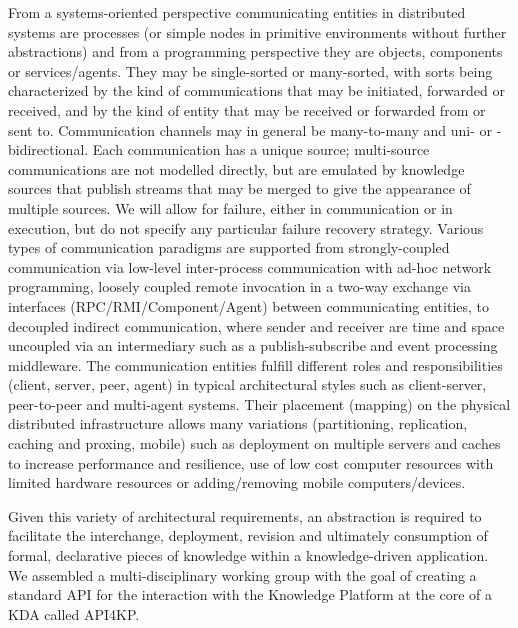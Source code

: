 \documentclass[runningheads]{llncs}
\begin{document}
From a systems-oriented perspective communicating entities in distributed systems are processes (or simple nodes in primitive environments without further abstractions) and from a programming perspective they are objects, components or services/agents. They may be single-sorted or many-sorted, with sorts being characterized by the kind of communications that may be initiated, forwarded or received, and by the kind of entity that may be received or forwarded from or sent to.
Communication channels may in general be many-to-many and uni- or -bidirectional. Each communication has a unique source; multi-source communications are not modelled directly, but are emulated by knowledge sources that publish streams that may be merged to give the appearance of multiple sources. We will allow for failure, either in communication or in execution, but do not specify any particular failure recovery strategy. 
Various types of communication paradigms are supported from strongly-coupled communication via low-level inter-process communication with ad-hoc network programming, loosely coupled remote invocation in a two-way exchange via interfaces  (RPC/RMI/Component/Agent) between communicating entities, to decoupled indirect communication, where sender and receiver are time and space uncoupled via an intermediary such as a publish-subscribe and event processing middleware.
The communication entities fulfill different roles and responsibilities (client, server, peer, agent) in typical architectural styles such as client-server, peer-to-peer and multi-agent systems. Their placement (mapping) on the physical distributed infrastructure allows many variations (partitioning, replication, caching and proxing, mobile) such as deployment on multiple servers and caches to increase performance and resilience, use of low cost computer resources with limited hardware resources or adding/removing mobile computers/devices.

Given this variety of architectural requirements, an abstraction is required to facilitate the interchange, deployment, revision and ultimately consumption of formal, declarative pieces of knowledge within a knowledge-driven application. We assembled a multi-disciplinary working group with the goal of creating a standard API for the interaction with the Knowledge Platform at the core of a KDA called API4KP. 
\end{document}
